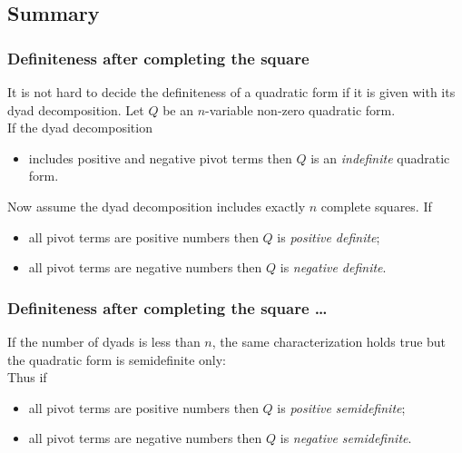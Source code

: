 \subsection{Summary}
\begin{frame}
    \frametitle{Definiteness after completing the square}
    It is not hard to decide the definiteness of a quadratic form if it is given with its dyad decomposition.
    Let $Q$ be an $n$-variable non-zero quadratic form.\\
    If the dyad decomposition 
    \begin{itemize}
        \item includes positive and negative pivot terms then $Q$ is an \alert{\emph{indefinite}} quadratic form.
    \end{itemize}
    Now assume the dyad decomposition includes exactly $n$ complete squares.
    If
    \begin{itemize}
        \item all pivot terms are positive numbers then $Q$ is \alert{\emph{positive definite}};
        \item all pivot terms are negative numbers then $Q$ is \alert{\emph{negative definite}}.
    \end{itemize}
\end{frame}
\begin{frame}
    \frametitle{Definiteness after completing the square \ldots}
    If the number of dyads is less than $n$, 
    the same characterization holds true but the quadratic form is semidefinite only:\\
    Thus if
    \begin{itemize}
        \item all pivot terms are positive numbers then $Q$ is \alert{\emph{positive semidefinite}};
        \item all pivot terms are negative numbers then $Q$ is \alert{\emph{negative semidefinite}}.
    \end{itemize}
\end{frame}

